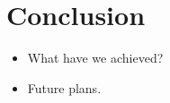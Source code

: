 \chapter{Conclusion}
\label{conclusion}

\begin{itemize}
   \item What have we achieved?
   \item Future plans.
\end{itemize}


